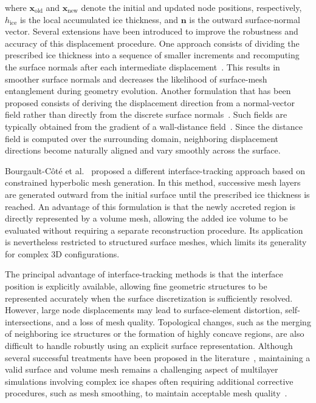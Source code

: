where $\boldsymbol{x}_{\mathrm{old}}$ and $\boldsymbol{x}_{\mathrm{new}}$ denote the initial and updated node positions, respectively, $h_{\mathrm{ice}}$ is the local accumulated ice thickness, and $\boldsymbol{n}$ is the outward surface-normal vector. Several extensions have been introduced to improve the robustness and accuracy of this displacement procedure. One approach consists of dividing the prescribed ice thickness into a sequence of smaller increments and recomputing the surface normals after each intermediate displacement~\cite{pueyo2001improvements}. This results in smoother surface normals and decreases the likelihood of surface-mesh entanglement during geometry evolution. Another formulation that has been proposed consists of deriving the displacement direction from a normal-vector field rather than directly from the discrete surface normals~\cite{radenac2024workflow,pabloIcing}. Such fields are typically obtained from the gradient of a wall-distance field~\cite{tuckerEikonal}. Since the distance field is computed over the surrounding domain, neighboring displacement directions become naturally aligned and vary smoothly across the surface.

Bourgault-Côté et al.~\cite{bourgault-coteMultilayerAirfoilIce2019} proposed a different interface-tracking approach based on constrained hyperbolic mesh generation. In this method, successive mesh layers are generated outward from the initial surface until the prescribed ice thickness is reached. An advantage of this formulation is that the newly accreted region is directly represented by a volume mesh, allowing the added ice volume to be evaluated without requiring a separate reconstruction procedure. Its application is nevertheless restricted to structured surface meshes, which limits its generality for complex 3D configurations.

The principal advantage of interface-tracking methods is that the interface position is explicitly available, allowing fine geometric structures to be represented accurately when the surface discretization is sufficiently resolved. However, large node displacements may lead to surface-element distortion, self-intersections,  and a loss of mesh quality. Topological changes, such as the merging of neighboring ice structures or the formation of highly concave regions, are also difficult to handle robustly using an explicit surface representation. Although several successful treatments have been proposed in the literature~\cite{glimm2000}, maintaining a valid surface and volume mesh remains a challenging aspect of multilayer simulations involving complex ice shapes often requiring additional corrective procedures, such as mesh smoothing, to maintain acceptable mesh quality~\cite{taubinFilter}.


